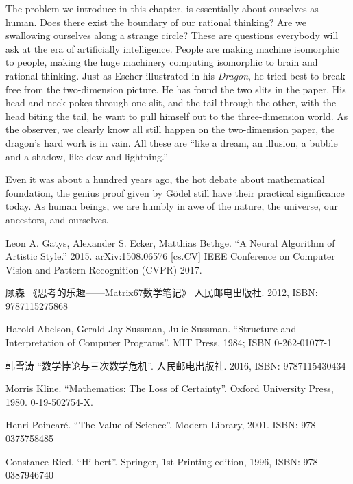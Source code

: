 \documentclass{article}
\begin{document}
The problem we introduce in this chapter, is essentially about ourselves as human. Does there exist the boundary of our rational thinking? Are we swallowing ourselves along a strange circle? These are questions everybody will ask at the era of artificially intelligence. People are making machine isomorphic to people, making the huge machinery computing isomorphic to brain and rational thinking. Just as Escher illustrated in his {\em Dragon}, he tried best to break free from the two-dimension picture. He has found the two slits in the paper. His head and neck pokes through one slit, and the tail through the other, with the head biting the tail, he want to pull himself out to the three-dimension world. As the observer, we clearly know all still happen on the two-dimension paper, the dragon's hard work is in vain. All these are ``like a dream, an illusion, a bubble and a shadow, like dew and lightning.''

Even it was about a hundred years ago, the hot debate about mathematical foundation, the genius proof given by Gödel still have their practical significance today. As human beings, we are humbly in awe of the nature, the universe, our ancestors, and ourselves.

\ifx\wholebook\relax \else
\begin{thebibliography}{99}

Leon A. Gatys, Alexander S. Ecker, Matthias Bethge. ``A Neural Algorithm of Artistic Style.'' 2015. arXiv:1508.06576 [cs.CV] IEEE Conference on Computer Vision and Pattern Recognition (CVPR) 2017.

{\fontspec{\cnmainft}顾森 《思考的乐趣——Matrix67数学笔记》 人民邮电出版社.} 2012, ISBN: 9787115275868

Harold Abelson, Gerald Jay Sussman, Julie Sussman. ``Structure and Interpretation of Computer Programs''. MIT Press, 1984; ISBN 0-262-01077-1

{\fontspec{\cnmainft}韩雪涛 ``数学悖论与三次数学危机''. 人民邮电出版社}. 2016, ISBN: 9787115430434

Morris Kline. ``Mathematics: The Loss of Certainty''. Oxford University Press, 1980. 0-19-502754-X.

Henri Poincaré. ``The Value of Science''. Modern Library, 2001. ISBN: 978-0375758485

Constance Ried. ``Hilbert''. Springer, 1st Printing edition, 1996, ISBN: 978-0387946740

\end{thebibliography}

\expandafter\enddocument

\fi
\end{document}
